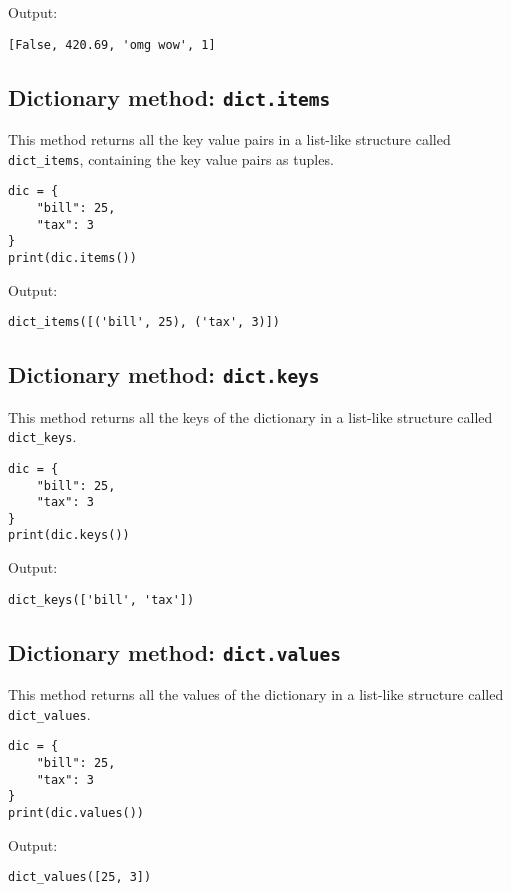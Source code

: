 \documentclass[11pt]{article}
\begin{document}
 \noindent Output:

\begin{verbatim}
[False, 420.69, 'omg wow', 1]
\end{verbatim}

\subsection{Dictionary method: \texttt{dict.items}}
\label{sec:orgef251b9}
This method returns all the key value pairs in a list-like structure called \texttt{dict\_items}, containing the key value pairs as tuples.
\begin{verbatim}
dic = {
    "bill": 25,
    "tax": 3
}
print(dic.items())
\end{verbatim}

 \noindent Output:

\begin{verbatim}
dict_items([('bill', 25), ('tax', 3)])
\end{verbatim}

\subsection{Dictionary method: \texttt{dict.keys}}
\label{sec:orgec27571}
This method returns all the keys of the dictionary in a list-like structure called \texttt{dict\_keys}.
\begin{verbatim}
dic = {
    "bill": 25,
    "tax": 3
}
print(dic.keys())
\end{verbatim}

 \noindent Output:

\begin{verbatim}
dict_keys(['bill', 'tax'])
\end{verbatim}

\subsection{Dictionary method: \texttt{dict.values}}
\label{sec:orge4b48f1}
This method returns all the values of the dictionary in a list-like structure called \texttt{dict\_values}.
\begin{verbatim}
dic = {
    "bill": 25,
    "tax": 3
}
print(dic.values())
\end{verbatim}

 \noindent Output:

\begin{verbatim}
dict_values([25, 3])
\end{verbatim}
\end{document}
